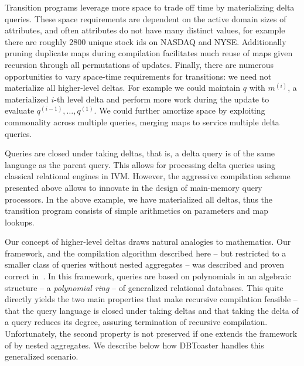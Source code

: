 Transition programs leverage more space to trade off time by materializing delta
queries. These space requirements are dependent on the active domain sizes of
attributes, and often attributes do not have many distinct values, for example
there are roughly 2800 unique stock ids on NASDAQ and NYSE. Additionally pruning
duplicate maps during compilation facilitates much reuse of maps given recursion
through all permutations of updates. Finally, there are numerous opportunities
to vary space-time requirements for transitions: we need not materialize all
higher-level deltas. For example we could maintain $q$ with $m^{(i)}$, a
materialized $i$-th level delta and perform more work during the update to
evaluate $q^{(i-1)}, \ldots, q^{(1)}$. We could further amortize space by
exploiting commonality across multiple queries, merging maps to service multiple
delta queries.



Queries are closed under taking deltas, that is, a delta query is of the same
language as the parent query. This allows for processing delta queries using
classical relational engines in IVM.
However, the aggressive compilation scheme presented above allows to innovate in
the design of main-memory query processors.
In the above example, we have materialized all
deltas, thus the transition program consists of simple arithmetics on parameters
and map lookups.

Our concept of higher-level deltas draws natural analogies to
mathematics. Our framework, and the compilation algorithm described here
-- but restricted to a smaller class of queries without nested aggregates
-- was described and proven correct in~\cite{koch-pods:10}.
In this framework, queries are based on polynomials in an
algebraic structure -- a {\em polynomial ring} --
of generalized relational databases.
This quite directly yields the two main properties that make recursive
compilation feasible -- that the query language is closed under taking deltas
and that taking the delta of a query reduces its degree, assuring termination of
recursive compilation.
Unfortunately, the second property is not preserved if one extends the
framework of \cite{koch-pods:10} by nested aggregates. We describe below
how DBToaster handles this generalized scenario.

